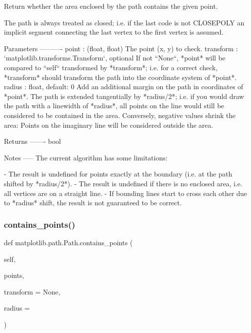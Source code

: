\begin{DoxyVerb}Return whether the area enclosed by the path contains the given point.

The path is always treated as closed; i.e. if the last code is not
CLOSEPOLY an implicit segment connecting the last vertex to the first
vertex is assumed.

Parameters
----------
point : (float, float)
    The point (x, y) to check.
transform : `matplotlib.transforms.Transform`, optional
    If not ``None``, *point* will be compared to ``self`` transformed
    by *transform*; i.e. for a correct check, *transform* should
    transform the path into the coordinate system of *point*.
radius : float, default: 0
    Add an additional margin on the path in coordinates of *point*.
    The path is extended tangentially by *radius/2*; i.e. if you would
    draw the path with a linewidth of *radius*, all points on the line
    would still be considered to be contained in the area. Conversely,
    negative values shrink the area: Points on the imaginary line
    will be considered outside the area.

Returns
-------
bool

Notes
-----
The current algorithm has some limitations:

- The result is undefined for points exactly at the boundary
  (i.e. at the path shifted by *radius/2*).
- The result is undefined if there is no enclosed area, i.e. all
  vertices are on a straight line.
- If bounding lines start to cross each other due to *radius* shift,
  the result is not guaranteed to be correct.
\end{DoxyVerb}
 \mbox{\label{classmatplotlib_1_1path_1_1Path_a0a8e16efd366cb77c64aeda4de05444d}} 
\subsubsection{\texorpdfstring{contains\+\_\+points()}{contains\_points()}}
{\footnotesize\ttfamily def matplotlib.\+path.\+Path.\+contains\+\_\+points (\begin{DoxyParamCaption}\item[{}]{self,  }\item[{}]{points,  }\item[{}]{transform = {\ttfamily None},  }\item[{}]{radius = {} }\end{DoxyParamCaption})}

